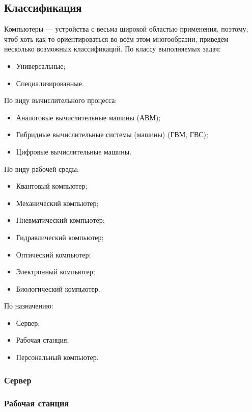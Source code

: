 \subsection{Классификация}\label{base:introduction:computer:classification}
Компьютеры --- устройства с весьма широкой областью применения, поэтому, чтоб хоть как-то ориентироваться во всём этом многообразии, приведём несколько возможных классификаций.
По классу выполняемых задач:
\begin{itemize}
 \item Универсальные;
 \item Специализированные.
\end{itemize}
По виду вычислительного процесса:
\begin{itemize}
 \item Аналоговые вычислительные машины (АВМ);
 \item Гибридные вычислительные системы (машины) (ГВМ, ГВС);
 \item Цифровые вычислительные машины.
\end{itemize}
По виду рабочей среды:
\begin{itemize}
 \item Квантовый компьютер;
 \item Механический компьютер;
 \item Пневматический компьютер;
 \item Гидравлический компьютер;
 \item Оптический компьютер;
 \item Электронный компьютер;
 \item Биологический компьютер.
\end{itemize}
По назначению:
\begin{itemize}
 \item Сервер;
 \item Рабочая станция;
 \item Персональный компьютер.
\end{itemize}

\subsubsection{Сервер}\label{base:introduction:computer:classification:server}

\subsubsection{Рабочая станция}\label{base:introduction:computer:classification:workstation}

